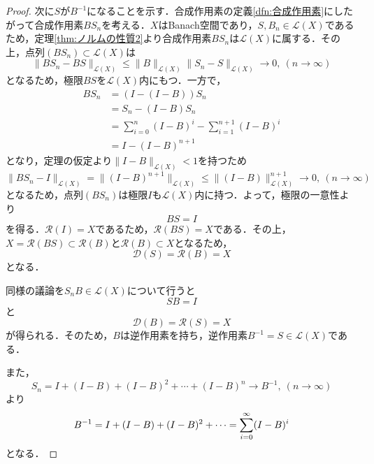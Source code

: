 \documentclass[11pt,a4paper,titlepage]{jsreport}
\theoremstyle{definition}
\begin{document}
\begin{proof}
  次に$S$が$B^{-1}$になることを示す．合成作用素の定義\ref{dfn:合成作用素}にしたがって合成作用素$BS_n$を考える．$X$はBanach空間であり，$S,B_n\in\mathcal{L}(X)$であるため，定理\ref{thm:ノルムの性質2}より合成作用素$BS_n$は$\mathcal{L}(X)$に属する．その上，点列$(BS_n)\subset\mathcal{L}(X)$は
  \begin{equation*}
    \|BS_n-BS\|_{\mathcal{L}(X)} \leq \|B\|_{\mathcal{L}(X)}\|S_n-S\|_{\mathcal{L}(X)}\rightarrow 0,\ (n\rightarrow \infty)
  \end{equation*}
  となるため，極限$BS$を$\mathcal{L}(X)$内にもつ．一方で，
  \begin{align*}
    BS_n & = (I-(I-B))S_n                                 \\
         & = S_n-(I-B)S_n                                 \\
         & = \sum^n_{i=0}(I-B)^i -\sum^{n+1}_{i=1}(I-B)^i \\
         & = I-(I-B)^{n+1}
  \end{align*}
  となり，定理の仮定より$\|I-B\|_{\mathcal{L}(X)}<1$を持つため
  \begin{equation*}
    \|BS_n-I\|_{\mathcal{L}(X)} = \|(I-B)^{n+1}\|_{\mathcal{L}(X)} \leq \|(I-B)\|^{n+1}_{\mathcal{L}(X)} \rightarrow 0,\ (n\rightarrow \infty)
  \end{equation*}
  となるため，点列$(BS_n)$は極限$I$も$\mathcal{L}(X)$内に持つ．よって，極限の一意性より
  \begin{equation*}
    BS=I
  \end{equation*}
  を得る．$\mathcal{R}(I)=X$であるため，$\mathcal{R}(BS)=X$である．その上，$X=\mathcal{R}(BS)\subset \mathcal{R}(B)$と$\mathcal{R}(B)\subset X$となるため，
  \begin{equation*}
    \mathcal{D}(S)=\mathcal{R}(B)=X
  \end{equation*}
  となる．

  同様の議論を$S_nB\in\mathcal{L}(X)$について行うと
  \begin{equation*}
    SB=I
  \end{equation*}
  と
  \begin{equation*}
    \mathcal{D}(B)=\mathcal{R}(S)=X
  \end{equation*}
  が得られる．そのため，$B$は逆作用素を持ち，逆作用素$B^{-1}=S\in\mathcal{L}(X)$である．

  また，
  \begin{equation*}
    S_n=I+(I-B)+(I-B)^2+\cdots+(I-B)^n \rightarrow B^{-1},\ (n\rightarrow\infty)
  \end{equation*}
  より
  \begin{equation*}
    B^{-1}=I+(I-B)+(I-B)^2+\cdots = \sum^{\infty}_{i=0}(I-B)^i\\
  \end{equation*}
  となる．


\end{proof}
\end{document}
